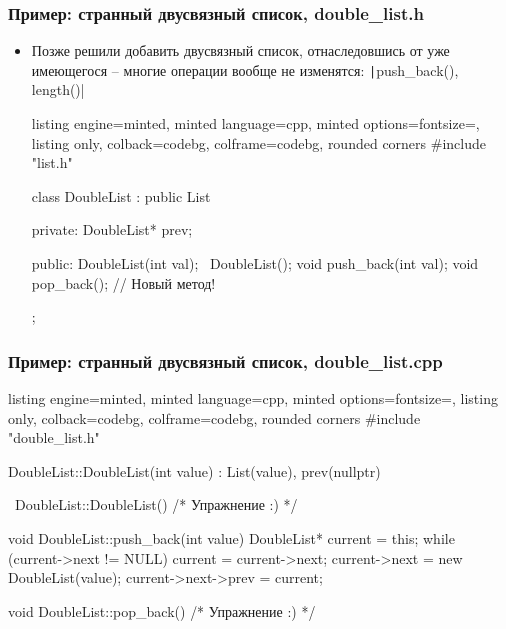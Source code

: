 \documentclass[10pt]{beamer}
\begin{document}
\begin{frame}[fragile]
\frametitle{Пример: странный двусвязный список, double\_list.h}
\begin{itemize}
\item Позже решили добавить двусвязный список, отнаследовшись от уже имеющегося -- многие операции вообще не изменятся: \texttt|push_back(), length()|
\pause
{}
\begin{tcblisting}{listing engine=minted, minted language=cpp, minted options={fontsize=\scriptsize}, listing only, colback=codebg, colframe=codebg, rounded corners}
#include "list.h"

class DoubleList : public List {
private:
  DoubleList* prev;

public:
  DoubleList(int val);
  ~DoubleList();
  void push_back(int val);
  void pop_back(); // Новый метод!
};
\end{tcblisting}
\end{itemize}
\end{frame}

\begin{frame}[fragile]
\frametitle{Пример: странный двусвязный список, double\_list.cpp}
\begin{itemize}
\begin{tcblisting}{listing engine=minted, minted language=cpp, minted options={fontsize=\scriptsize}, listing only, colback=codebg, colframe=codebg, rounded corners}
#include "double_list.h"

DoubleList::DoubleList(int value)
  : List(value), prev(nullptr)
{}

~DoubleList::DoubleList() { /* Упражнение :) */ }

void DoubleList::push_back(int value) {
  DoubleList* current = this;
  while (current->next != NULL)
    current = current->next;
  current->next = new DoubleList(value);
  current->next->prev = current;
}

void DoubleList::pop_back() { /* Упражнение :) */ }
\end{tcblisting}
\end{itemize}
\end{frame}
\end{document}
